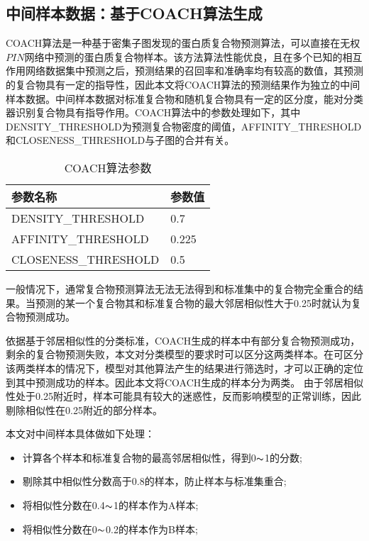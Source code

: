 \subsection{中间样本数据：基于COACH算法生成}
\label{subsection:allSample:middleSampleData}

COACH算法是一种基于密集子图发现的蛋白质复合物预测算法，可以直接在无权$PIN$网络中预测的蛋白质复合物样本。该方法算法性能优良，且在多个已知的相互作用网络数据集中预测之后，预测结果的召回率和准确率均有较高的数值，其预测的复合物具有一定的指导性，因此本文将COACH算法的预测结果作为独立的中间样本数据。中间样本数据对标准复合物和随机复合物具有一定的区分度，能对分类器识别复合物具有指导作用。COACH算法中的参数处理如下，其中DENSITY\_THRESHOLD为预测复合物密度的阈值，AFFINITY\_THRESHOLD和CLOSENESS\_THRESHOLD与子图的合并有关。
\begin{table}[h]
    \centering
    \caption{COACH算法参数}
    \label{tab:COACH}
    \begin{tabular}{C{5cm}C{2cm}}
        \toprule
        \textbf{参数名称}    & \textbf{参数值} \\
        \midrule
        DENSITY\_THRESHOLD   & 0.7             \\
        AFFINITY\_THRESHOLD  & 0.225           \\
        CLOSENESS\_THRESHOLD & 0.5             \\
        \bottomrule
    \end{tabular}
\end{table}

一般情况下，通常复合物预测算法无法无法得到和标准集中的复合物完全重合的结果。当预测的某一个复合物其和标准复合物的最大邻居相似性大于0.25时就认为复合物预测成功。

依据基于邻居相似性的分类标准，COACH生成的样本中有部分复合物预测成功，剩余的复合物预测失败，本文对分类模型的要求时可以区分这两类样本。在可区分该两类样本的情况下，模型对其他算法产生的结果进行筛选时，才可以正确的定位到其中预测成功的样本。因此本文将COACH生成的样本分为两类。
由于邻居相似性处于0.25附近时，样本可能具有较大的迷惑性，反而影响模型的正常训练，因此剔除相似性在0.25附近的部分样本。

本文对中间样本具体做如下处理：
\begin{itemize}
    \item 计算各个样本和标准复合物的最高邻居相似性，得到0$\thicksim$1的分数;
    \item 剔除其中相似性分数高于0.8的样本，防止样本与标准集重合;
    \item 将相似性分数在0.4$\thicksim$1的样本作为A样本;
    \item 将相似性分数在0$\thicksim$0.2的样本作为B样本;
\end{itemize}

